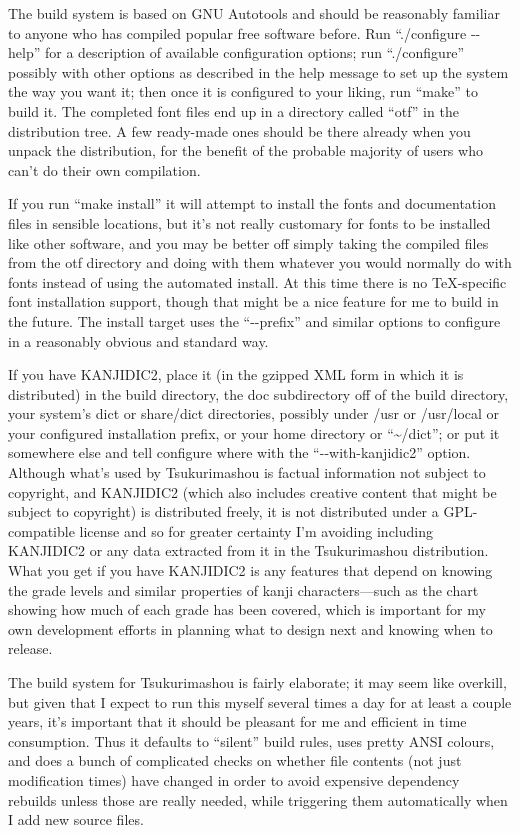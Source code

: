 \documentclass[14pt]{extarticle}
\begin{document}
The build system is based on GNU Autotools and should be reasonably familiar
to anyone who has compiled popular free software before.  Run ``./configure
-{}-help'' for a description of available configuration options; run
``./configure'' possibly with other options as described in the help message
to set up the system the way you want it; then once it is configured to your
liking, run ``make'' to build it.  The completed font files end up in a
directory called ``otf'' in the distribution tree. A few ready-made ones
should be there already when you unpack the distribution, for the benefit of
the probable majority of users who can't do their own compilation.

If you run ``make install'' it will attempt to install the fonts and
documentation files in sensible locations, but it's not really customary for
fonts to be installed like other software, and you may be better off simply
taking the compiled files from the otf directory and doing with them
whatever you would normally do with fonts instead of using the
automated install.  At this time there is no \TeX-specific font installation
support, though that might be a nice feature for me to build in the future. 
The install target uses the ``-{}-prefix'' and similar options to configure
in a reasonably obvious and standard way.

If you have KANJIDIC2, place it (in the gzipped XML form in which it is
distributed) in the build directory, the doc subdirectory off of the build
directory, your system's dict or share/dict directories, possibly under
/usr or /usr/local or your configured installation prefix, or your home
directory or ``\textasciitilde/dict''; or put it
somewhere else and tell configure where with the ``-{}-with-kanjidic2''
option.  Although what's used by Tsukurimashou is factual information not
subject to copyright, and KANJIDIC2 (which also includes creative content
that might be subject to copyright) is distributed freely, it is not
distributed under a GPL-compatible license and so for greater certainty I'm
avoiding including KANJIDIC2 or any data extracted from it in the
Tsukurimashou distribution.  What you get if you have KANJIDIC2 is any
features that depend on knowing the grade levels and similar properties of
kanji characters---such as the chart showing how much of each grade has been
covered, which is important for my own development efforts in planning what
to design next and knowing when to release.

The build system for Tsukurimashou is fairly elaborate; it may seem like
overkill, but given that I expect to run this myself several times a day for
at least a couple years, it's important that it should be pleasant for me and
efficient in time consumption.  Thus it defaults to ``silent'' build rules,
uses pretty ANSI colours, and does a bunch of complicated checks on whether
file contents (not just modification times) have changed in order to avoid
expensive dependency rebuilds unless those are really needed, while
triggering them automatically when I add new source files.
\end{document}
